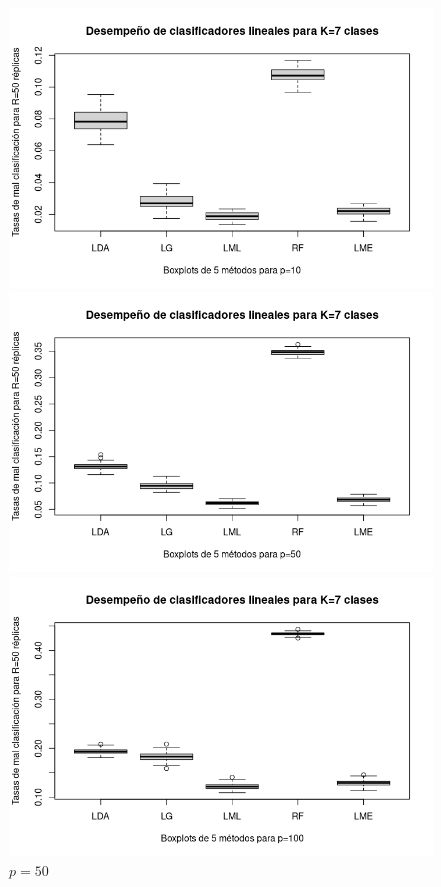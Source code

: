 \documentclass{report}
\begin{document}
  \begin{figure} [h]
  	\begin{multicols}{2}
  		\includegraphics[width=\linewidth]{7_clases_p10_sigma_I}\par 
  		\caption*{$p=10$}
  		\includegraphics[width=\linewidth]{7_clases_p50_sigma_I}\par 
  		\caption*{$p=50$}	 
  	\end{multicols}
  	\begin{multicols}{2}
  		\includegraphics[width=\linewidth]{7_clases_p100_sigma_I}\par

\end{multicols}
\end{figure}
\end{document}
